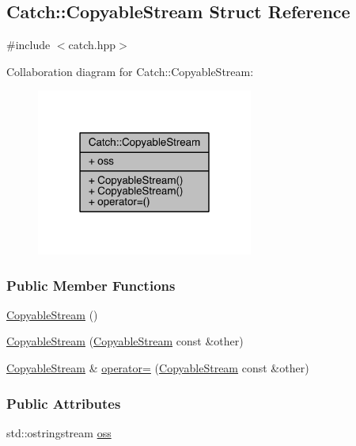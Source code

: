 \hypertarget{a00014}{}\subsection{Catch\+:\+:Copyable\+Stream Struct Reference}
\label{a00014}


{\ttfamily \#include $<$catch.\+hpp$>$}



Collaboration diagram for Catch\+:\+:Copyable\+Stream\+:\nopagebreak
\begin{figure}[H]
\begin{center}
\leavevmode
\includegraphics[width=202pt]{a00183}
\end{center}
\end{figure}
\subsubsection*{Public Member Functions}
\begin{DoxyCompactItemize}
\item 
\hyperlink{a00014_a5a61d0da675ae00cd46efaef4c445cdd}{Copyable\+Stream} ()
\item 
\hyperlink{a00014_a0e72dc16240653f52c17106f4bf34da8}{Copyable\+Stream} (\hyperlink{a00014}{Copyable\+Stream} const \&other)
\item 
\hyperlink{a00014}{Copyable\+Stream} \& \hyperlink{a00014_a1760fa29b38011c5845171260bec0966}{operator=} (\hyperlink{a00014}{Copyable\+Stream} const \&other)
\end{DoxyCompactItemize}
\subsubsection*{Public Attributes}
\begin{DoxyCompactItemize}
\item 
std\+::ostringstream \hyperlink{a00014_ae123fb4d673e7d7a13a3c5f6bc5d426c}{oss}
\end{DoxyCompactItemize}


